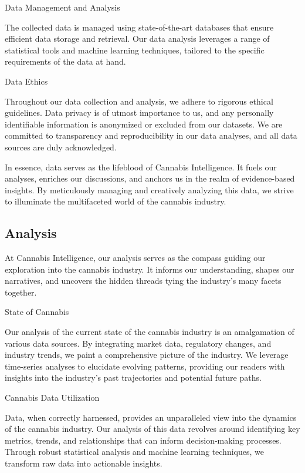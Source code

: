 \documentclass[../article.tex, 12pt]{subfiles}
\begin{document}
\begin{multicols*}{2}
Data Management and Analysis

The collected data is managed using state-of-the-art databases that ensure efficient data storage and retrieval. Our data analysis leverages a range of statistical tools and machine learning techniques, tailored to the specific requirements of the data at hand.

Data Ethics

Throughout our data collection and analysis, we adhere to rigorous ethical guidelines. Data privacy is of utmost importance to us, and any personally identifiable information is anonymized or excluded from our datasets. We are committed to transparency and reproducibility in our data analyses, and all data sources are duly acknowledged.

In essence, data serves as the lifeblood of Cannabis Intelligence. It fuels our analyses, enriches our discussions, and anchors us in the realm of evidence-based insights. By meticulously managing and creatively analyzing this data, we strive to illuminate the multifaceted world of the cannabis industry.


\subsection{Analysis}

At Cannabis Intelligence, our analysis serves as the compass guiding our exploration into the cannabis industry. It informs our understanding, shapes our narratives, and uncovers the hidden threads tying the industry's many facets together.

State of Cannabis

Our analysis of the current state of the cannabis industry is an amalgamation of various data sources. By integrating market data, regulatory changes, and industry trends, we paint a comprehensive picture of the industry. We leverage time-series analyses to elucidate evolving patterns, providing our readers with insights into the industry's past trajectories and potential future paths.

Cannabis Data Utilization

Data, when correctly harnessed, provides an unparalleled view into the dynamics of the cannabis industry. Our analysis of this data revolves around identifying key metrics, trends, and relationships that can inform decision-making processes. Through robust statistical analysis and machine learning techniques, we transform raw data into actionable insights.


\end{multicols*}
\end{document}
